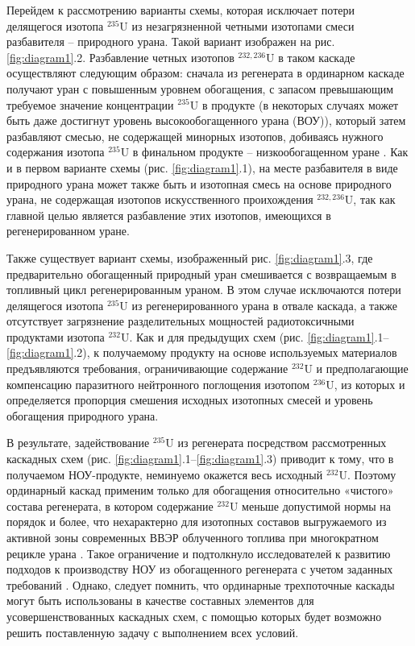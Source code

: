 Перейдем к рассмотрению варианты схемы, которая исключает потери делящегося изотопа $^{235}$U из незагрязненной четными изотопами смеси разбавителя -- природного урана. Такой вариант изображен на рис. \ref{fig:diagram1}.2. Разбавление четных изотопов $^{232,236}$U в таком каскаде осуществляют следующим образом: сначала из регенерата в ординарном каскаде получают уран с повышенным уровнем обогащения, с запасом превышающим требуемое значение концентрации $^{235}$U в продукте (в некоторых случаях может быть даже достигнут уровень высокообогащенного урана (ВОУ)), который затем разбавляют смесью, не содержащей минорных изотопов, добиваясь нужного содержания изотопа $^{235}$U в финальном продукте -- низкообогащенном уране \cite{SposobIzotopnogoVosstanovleniyaa}. Как и в первом варианте схемы (рис. \ref{fig:diagram1}.1), на месте разбавителя в виде природного урана может также быть и изотопная смесь на основе природного урана, не содержащая изотопов искусственного проихождения $^{232,236}$U, так как главной целью является разбавление этих изотопов, имеющихся в регенерированном уране.

Также существует вариант схемы, изображенный рис. \ref{fig:diagram1}.3, где предварительно обогащенный природный уран смешивается с возвращаемым в топливный цикл регенерированным ураном. В этом случае исключаются потери делящегося изотопа $^{235}$U из регенерированного урана в отвале каскада, а также отсутствует загрязнение разделительных мощностей радиотоксичными продуктами изотопа $^{232}$U. Как и для предыдущих схем (рис. \ref{fig:diagram1}.1--\ref{fig:diagram1}.2), к получаемому продукту на основе используемых материалов предъявляются требования, ограничивающие содержание $^{232}$U и предполагающие компенсацию паразитного нейтронного поглощения изотопом $^{236}$U, из которых и определяется пропорция смешения исходных изотопных смесей и уровень обогащения природного урана.


В результате, задействование $^{235}$U из регенерата посредством рассмотренных каскадных схем (рис. \ref{fig:diagram1}.1--\ref{fig:diagram1}.3) приводит к тому, что в получаемом НОУ-продукте, неминуемо окажется весь исходный $^{232}$U. Поэтому ординарный каскад применим только для обогащения относительно «чистого» состава регенерата, в котором содержание $^{232}$U меньше допустимой нормы на порядок и более, что нехарактерно для изотопных составов выгружаемого из активной зоны современных ВВЭР облученного топлива при многократном рецикле урана \cite{bormanTehnikoekonomicheskiyAnalizVozmozhnyh2012}. Такое ограничение и подтолкнуло исследователей к развитию подходов к производству НОУ из обогащенного регенерата с учетом заданных требований \cite{sulaberidzeNekotoryhRazdelitelnyhProblemah2004,sulaberidzeProblemsRefinementRecycled4, smirnovKaskadnyeShemyZadachah2012}. Однако, следует помнить, что ординарные трехпоточные каскады могут быть использованы в качестве составных элементов для усовершенствованных каскадных схем, с помощью которых будет возможно решить поставленную задачу с выполнением всех условий.

